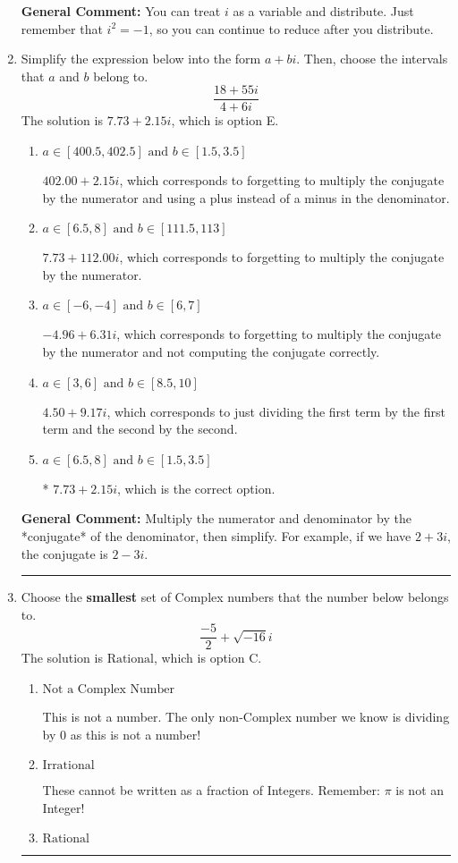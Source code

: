 \documentclass{extbook}[14pt]
\newcommand{\litem}[1]{\item #1

\rule{\textwidth}{0.4pt}}
\begin{document}
\begin{enumerate}
{\textbf{General Comment:} You can treat $i$ as a variable and distribute. Just remember that $i^2=-1$, so you can continue to reduce after you distribute.
}
\litem{
Simplify the expression below into the form $a+bi$. Then, choose the intervals that $a$ and $b$ belong to.
\[ \frac{18 + 55 i}{4 + 6 i} \]The solution is \( 7.73  + 2.15 i \), which is option E.\begin{enumerate}[label=\Alph*.]
\item \( a \in [400.5, 402.5] \text{ and } b \in [1.5, 3.5] \)

 $402.00  + 2.15 i$, which corresponds to forgetting to multiply the conjugate by the numerator and using a plus instead of a minus in the denominator.
\item \( a \in [6.5, 8] \text{ and } b \in [111.5, 113] \)

 $7.73  + 112.00 i$, which corresponds to forgetting to multiply the conjugate by the numerator.
\item \( a \in [-6, -4] \text{ and } b \in [6, 7] \)

 $-4.96  + 6.31 i$, which corresponds to forgetting to multiply the conjugate by the numerator and not computing the conjugate correctly.
\item \( a \in [3, 6] \text{ and } b \in [8.5, 10] \)

 $4.50  + 9.17 i$, which corresponds to just dividing the first term by the first term and the second by the second.
\item \( a \in [6.5, 8] \text{ and } b \in [1.5, 3.5] \)

* $7.73  + 2.15 i$, which is the correct option.
\end{enumerate}

\textbf{General Comment:} Multiply the numerator and denominator by the *conjugate* of the denominator, then simplify. For example, if we have $2+3i$, the conjugate is $2-3i$.
}
\litem{
Choose the \textbf{smallest} set of Complex numbers that the number below belongs to.
\[ \frac{-5}{2}+\sqrt{-16}i \]The solution is \( \text{Rational} \), which is option C.\begin{enumerate}[label=\Alph*.]
\item \( \text{Not a Complex Number} \)

This is not a number. The only non-Complex number we know is dividing by 0 as this is not a number!
\item \( \text{Irrational} \)

These cannot be written as a fraction of Integers. Remember: $\pi$ is not an Integer!
\item \( \text{Rational} \)


\end{enumerate}}
\end{enumerate}
\end{document}
